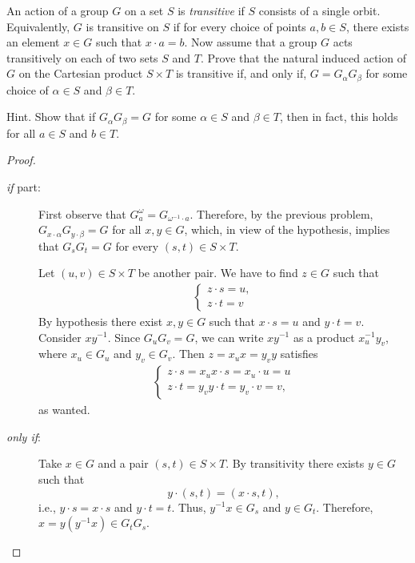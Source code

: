 \begin{probl}
    An action of a group\/ $G$ on a set\/ $S$ is \textsl{transitive} if\/ $S$ consists of a single orbit. Equivalently, $G$ is transitive on\/ $S$ if for every choice of points $a,b \in S$, there exists an element $x \in G$ such that $x \cdot a = b$. Now assume that a group\/ $G$ acts transitively on each of two sets $S$ and\/ $T$. Prove that the natural induced action of\/ $G$ on the Cartesian product $S \times T$ is transitive if, and only if, $G=G_\alpha G_\beta$ for some choice of\/ $\alpha \in S$ and\/ $\beta \in T$.
    
    \textrm{\upshape Hint. Show that if $G_\alpha G_\beta=G$ for some $\alpha \in S$ and $\beta \in T$, then in fact, this holds for all $a \in S$ and $b \in T$.}
\end{probl}
    
\begin{proof} 
\begin{description}
    
\item[\upshape\textit{if\/ } part:] First observe that $G_a^\omega=G_{\omega^{-1}\cdot a}$. Therefore, by the previous problem, $G_{x\cdot\alpha}G_{y\cdot\beta}=G$ for all $x,y\in G$, which, in view of the hypothesis, implies that $G_sG_t=G$ for every $(s,t)\in S\times T$.

Let $(u,v)\in S\times T$ be another pair. We have to find $z\in G$ such that
\begin{align*}
    \begin{cases}
        z\cdot s=u,\\
        z\cdot t=v
    \end{cases}
\end{align*}
By hypothesis there exist $x,y\in G$ such that $x\cdot s=u$ and $y\cdot t=v$. Consider $xy^{-1}$. Since $G_uG_v=G$, we can write $xy^{-1}$ as a product $x_u^{-1}y_v$, where $x_u\in G_u$ and $y_v\in G_v$. Then $z=x_ux=y_vy$ satisfies
\begin{align*}
    \begin{cases}
        z\cdot s = x_ux\cdot s=x_u\cdot u=u\\
        z\cdot t = y_vy\cdot t= y_v\cdot v=v,        
    \end{cases}
\end{align*}
as wanted.

\item[\upshape\textit{only if\/}:] Take $x\in G$ and a pair $(s,t)\in S\times T$. By transitivity there exists $y\in G$ such that
$$
    y\cdot(s,t)=(x\cdot s,t),
$$
i.e., $y\cdot s=x\cdot s$ and $y\cdot t=t$. Thus, $y^{-1}x\in G_s$ and\/ $y\in G_t$. Therefore, $x=y(y^{-1}x)\in G_tG_s$.  \end{description}
\end{proof}

